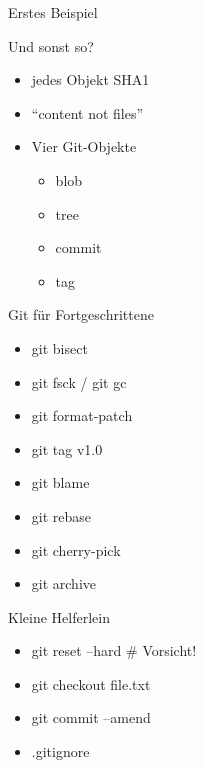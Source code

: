 \documentclass{beamer}
\begin{document}
\begin{frame}{Erstes Beispiel}

\end{frame}

\begin{frame}[<+->]{Und sonst so?}{}
  \begin{itemize}
    \item jedes Objekt SHA1
    \item ``content not files''
    \item Vier Git-Objekte
    \begin{itemize}
     \item blob
     \item tree
     \item commit
     \item tag
    \end{itemize}

  \end{itemize}
\end{frame}

\begin{frame}[<+->]{Git für Fortgeschrittene}{}
  \begin{itemize}
    \item git bisect
    \item git fsck / git gc
    \item git format-patch
    \item git tag v1.0
    \item git blame
    \item git rebase
    \item git cherry-pick
    \item git archive
  \end{itemize}
\end{frame}

\begin{frame}[<+->]{Kleine Helferlein}{}
  \begin{itemize}
    \item git reset --hard \# Vorsicht!
    \item git checkout file.txt
    \item git commit --amend
    \item .gitignore
  \end{itemize}
\end{frame}
\end{document}
